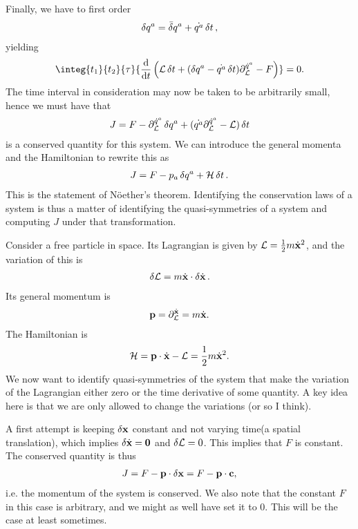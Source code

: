 Finally, we have to first order
\begin{align*}
	\var{q^{a}} = \bar{\delta}q^{a} + \dot{q^{a}}\var{t},
\end{align*}
yielding
\begin{align*}
	\integ{t_{1}}{t_{2}}{\tau}{\dv{t}\left(\lag\var{t} + (\var{q^{a}} - \dot{q^{a}}\var{t})\del{\dot{q}^{a}}{\lag} - F\right)} = 0.
\end{align*}
The time interval in consideration may now be taken to be arbitrarily small, hence we must have that
\begin{align*}
	J = F - \partial^{\dot{q}^{a}}_{\mathcal{L}}\var{q^{a}} + (\dot{q^{a}}\partial^{\dot{q}^{a}}_{\mathcal{L}} - \mathcal{L})\var{t}
\end{align*}
is a conserved quantity for this system. We can introduce the general momenta and the Hamiltonian to rewrite this as
\begin{align*}
	J = F - p_{a}\var{q^{a}} + \mathcal{H}\var{t}.
\end{align*}
This is the statement of Nöether's theorem. Identifying the conservation laws of a system is thus a matter of identifying the quasi-symmetries of a system and computing $J$ under that transformation.

Consider a free particle in space. Its Lagrangian is given by $\mathcal{L} = \frac{1}{2}m\dot{\vb{x}}^{2}$, and the variation of this is
\begin{align*}
\var{\ensuremath{\mathcal{L}}} = m\dot{\vb{x}}\cdot\var{\dot{\vb{x}}}.
\end{align*}
Its general momentum is
\begin{align*}
\vb{p} = \partial^{\dot{\vb{x}}}_{\mathcal{L}} = m\dot{\vb{x}}.
\end{align*}
The Hamiltonian is
\begin{align*}
\mathcal{H} = \vb{p}\cdot\dot{\vb{x}} - \mathcal{L} = \frac{1}{2}m\dot{\vb{x}}^{2}.
\end{align*}
We now want to identify quasi-symmetries of the system that make the variation of the Lagrangian either zero or the time derivative of some quantity. A key idea here is that we are only allowed to change the variations (or so I think).

A first attempt is keeping $\var{\vb{x}}$ constant and not varying time(a spatial translation), which implies $\var{\dot{\vb{x}}} = \vb{0}$ and $\var{\ensuremath{\mathcal{L}}} = 0$. This implies that $F$ is constant. The conserved quantity is thus
\begin{align*}
J = F - \vb{p}\cdot\var{\vb{x}} = F - \vb{p}\cdot\vb{c},
\end{align*}
i.e. the momentum of the system is conserved. We also note that the constant $F$ in this case is arbitrary, and we might as well have set it to $0$. This will be the case at least sometimes.

